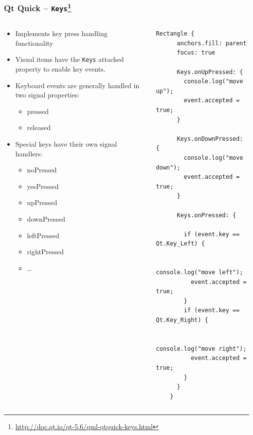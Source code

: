 \begin{frame}[fragile]
  \frametitle{Qt Quick -- \texttt{Keys}\footnote
    {\url{http://doc.qt.io/qt-5.6/qml-qtquick-keys.html}}}
  \begin{columns}
    \footnotesize
    \begin{column}{0.55\textwidth}
    \begin{itemize}
      \item Implements key press handling functionality
      \item Visual items have the \texttt{Keys} attached property to enable
        key events.
      \item Keyboard events are generally handled in two signal properties:
      \begin{itemize}
        \scriptsize
        \item pressed
        \item released
      \end{itemize}
      \item Special keys have their own signal handlers:
      \begin{itemize}
        \scriptsize
        \item noPressed
        \item yesPressed
        \item upPressed
        \item downPressed
        \item leftPressed
        \item rightPressed
        \item \ldots
      \end{itemize}
    \end{itemize}
    \end{column}
    \begin{column}{0.45\textwidth}
      \begin{lstlisting}[basicstyle=\tiny\ttfamily]
	Rectangle {
	  anchors.fill: parent
	  focus: true

	  Keys.onUpPressed: {
	    console.log("move up");
	    event.accepted = true;
	  }

	  Keys.onDownPressed: {
	    console.log("move down");
	    event.accepted = true;
	  }

	  Keys.onPressed: {

	    if (event.key == Qt.Key_Left) {

	      console.log("move left");
	      event.accepted = true;
	    }
	    if (event.key == Qt.Key_Right) {

	      console.log("move right");
	      event.accepted = true;
	    }
	  }
	}
      \end{lstlisting}
    \end{column}
  \end{columns}
\end{frame}

